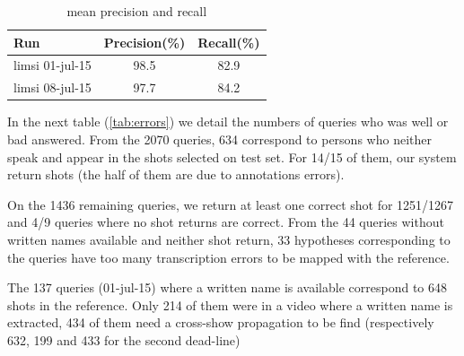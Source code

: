 \documentclass{acm_proc_article-me}
\begin{document}
\begin{table}[ht]
  \centering
  \begin{tabular}{|l|c|c|}
    \hline
	Run 				& Precision(\%)	& Recall(\%)		\\
	\hline
	\hline
	limsi 01-jul-15 	& 98.5			& 82.9			\\
	limsi 08-jul-15 	& 97.7			& 84.2			\\
  	\hline
  \end{tabular}
  \caption{mean precision and recall}
  \label{tab:precions_and_recall}
\end{table}

In the next table (\ref{tab:errors}) we detail the numbers of queries who was well or bad answered. From the 2070 queries, 634 correspond to persons who neither speak and appear in the shots selected on test set. For 14/15 of them, our system return shots (the half of them are due to annotations errors).

On the 1436 remaining queries, we return at least one correct shot for 1251/1267 and 4/9 queries where no shot returns are correct. From the 44 queries without written names available and neither shot return, 33 hypotheses corresponding to the queries have too many transcription errors to be mapped with the reference.

The 137 queries (01-jul-15) where a written name is available correspond to 648 shots in the reference. Only 214 of them were in a video where a written name is extracted, 434 of them need a cross-show propagation to be find (respectively 632, 199 and 433 for the second dead-line)
\end{document}

